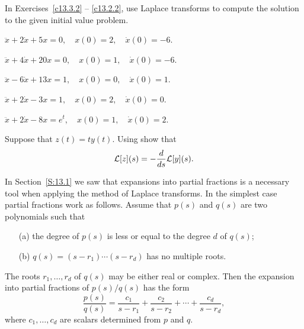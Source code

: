 \noindent In Exercises~\ref{c13.3.2} -- \ref{c13.2.2}, use Laplace transforms 
to compute the solution to the given initial value problem.
\begin{exercise} \label{c13.3.2}
$\ddot{x} + 2\dot x +5x = 0, \quad x(0) = 2, \quad \dot{x}(0) = -6$.
\end{exercise}
\begin{exercise} \label{c13.4.3a}
$\ddot x +4\dot x +20 x=0,\quad x(0)=1,\quad \dot{x}(0)=-6$.
\end{exercise}
\begin{exercise} \label{c13.4.3b}
$\ddot x -6\dot x +13 x=1,\quad x(0)=0,\quad \dot{x}(0)=1$.
\end{exercise}
\begin{exercise} \label{c13.2.1}
$\ddot{x} + 2\dot{x} - 3x  =  1, \quad x(0) = 2, \quad \dot{x}(0) = 0$.
\end{exercise}
\begin{exercise} \label{c13.2.2}
$\ddot{x} + 2\dot{x} - 8x = e^t, \quad x(0) = 1, \quad \dot{x}(0) = 2$.
\end{exercise}

\begin{exercise} \label{c13.1.2}
Suppose that $z(t)=ty(t)$.  Using  show that
\[
{\cal L}[z](s) = -\frac{\displaystyle d}{\displaystyle ds} {\cal L}[y](s).
\]
\end{exercise}


  \label{S:PF}

In Section~\ref{S:13.1} we saw that expansions into partial fractions is a 
necessary tool when applying the method of Laplace transforms.  In the
simplest case partial fractions work as follows.  Assume that $p(s)$ and 
$q(s)$ are two polynomials such that
\begin{enumerate}
\item[(a)] the degree of $p(s)$ is less or equal to the degree $d$ of $q(s)$;
\item[(b)] $q(s)=(s-r_1)\cdots(s-r_d)$ has no multiple roots.
\end{enumerate}
The roots $r_1,\ldots,r_d$ of $q(s)$ may be either real or complex.  Then the 
expansion into partial fractions of $p(s)/q(s)$ has the form
\begin{equation}  \label{E:PF}
\frac{p(s)}{q(s)} = \frac{c_1}{s-r_1}+\frac{c_2}{s-r_2}+\cdots
+\frac{c_d}{s-r_d},
\end{equation}
where $c_1,\ldots,c_d$ are  scalars determined from $p$ and $q$.

